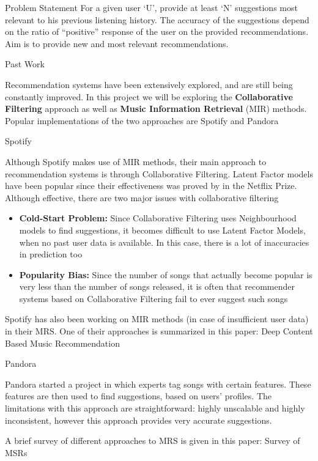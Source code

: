 \documentclass[11pt]{article}
\begin{document}
\begin{psection}{Problem Statement}
    For a given user `U', provide at least `N' suggestions most relevant to his previous listening history. The accuracy of the suggestions depend on the ratio of “positive” response of the user on the provided recommendations. Aim is to provide new and most relevant recommendations.
\end{psection}


\begin{psection}{Past Work}

    Recommendation systems have been extensively explored, and are still being constantly improved. In this project we will be exploring the
    \textbf{Collaborative Filtering} \cite{ColabFilter} approach as well as \textbf{Music Information Retrieval} (MIR) \cite{Bertin-Mahieux2011} methods. Popular implementations of the two approaches are Spotify and Pandora
    
    \begin{psubsection}{Spotify}

        Although Spotify makes use of MIR methods, their main approach to recommendation systems is through Collaborative Filtering. Latent Factor models have been popular since their effectiveness was proved by in the Netflix Prize. Although effective, there are two major issues with collaborative filtering

        \begin{itemize}
            \item \textbf{Cold-Start Problem:} Since Collaborative Filtering uses Neighbourhood models to find suggestions, it becomes difficult to use Latent Factor Models, when no past user data is available. In this case, there is a lot of inaccuracies in prediction too
            \item \textbf{Popularity Bias:} Since the number of songs that actually become popular is very less than the number of songs released, it is often that recommender systems based on Collaborative Filtering fail to ever suggest such songs
        \end{itemize}

        Spotify has also been working on MIR methods (in case of insufficient user data) in their MRS. One of their approaches is summarized in this paper: Deep Content Based Music Recommendation \cite{DeepCB}

    \end{psubsection}
    
    \begin{psubsection}{Pandora}

        Pandora started a project in which experts tag songs with certain features. These features are then used to find suggestions, based on users’ profiles. The limitations with this approach are straightforward: highly unscalable and highly inconsistent, however this approach provides very accurate suggestions.

    \end{psubsection}
    
    A brief survey of different approaches to MRS is given in this paper: Survey of MSRs \cite{SMRS}
  
\end{psection}
\end{document}
